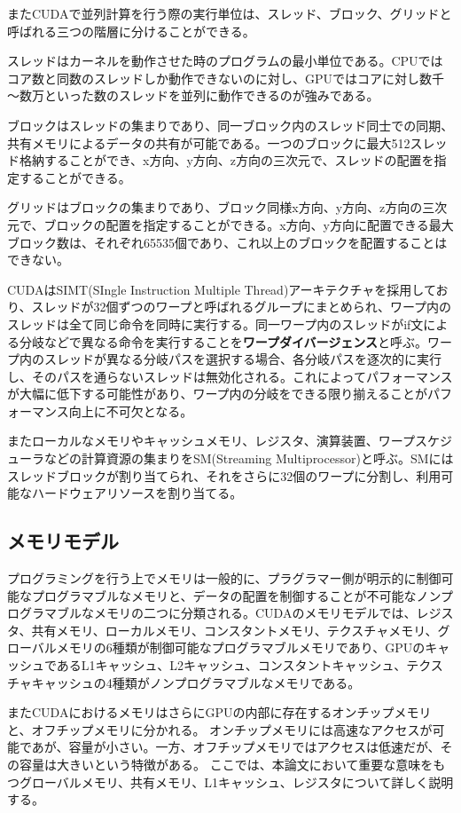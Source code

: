 \documentclass[a4paper,11pt,oneside,openany]{jsbook}
\begin{document}
またCUDAで並列計算を行う際の実行単位は、スレッド、ブロック、グリッドと呼ばれる三つの階層に分けることができる。

スレッドはカーネルを動作させた時のプログラムの最小単位である。CPUではコア数と同数のスレッドしか動作できないのに対し、GPUではコアに対し数千～数万といった数のスレッドを並列に動作できるのが強みである。

ブロックはスレッドの集まりであり、同一ブロック内のスレッド同士での同期、共有メモリによるデータの共有が可能である。一つのブロックに最大512スレッド格納することができ、x方向、y方向、z方向の三次元で、スレッドの配置を指定することができる。

グリッドはブロックの集まりであり、ブロック同様x方向、y方向、z方向の三次元で、ブロックの配置を指定することができる。x方向、y方向に配置できる最大ブロック数は、それぞれ65535個であり、これ以上のブロックを配置することはできない。

CUDAはSIMT(SIngle Instruction Multiple Thread)アーキテクチャを採用しており、スレッドが32個ずつのワープと呼ばれるグループにまとめられ、ワープ内のスレッドは全て同じ命令を同時に実行する。同一ワープ内のスレッドがif文による分岐などで異なる命令を実行することを{\bf ワープダイバージェンス}と呼ぶ。ワープ内のスレッドが異なる分岐パスを選択する場合、各分岐パスを逐次的に実行し、そのパスを通らないスレッドは無効化される。これによってパフォーマンスが大幅に低下する可能性があり、ワープ内の分岐をできる限り揃えることがパフォーマンス向上に不可欠となる。

またローカルなメモリやキャッシュメモリ、レジスタ、演算装置、ワープスケジューラなどの計算資源の集まりをSM(Streaming Multiprocessor)と呼ぶ。SMにはスレッドブロックが割り当てられ、それをさらに32個のワープに分割し、利用可能なハードウェアリソースを割り当てる。

\subsection{メモリモデル}
プログラミングを行う上でメモリは一般的に、プラグラマー側が明示的に制御可能なプログラマブルなメモリと、データの配置を制御することが不可能なノンプログラマブルなメモリの二つに分類される。CUDAのメモリモデルでは、レジスタ、共有メモリ、ローカルメモリ、コンスタントメモリ、テクスチャメモリ、グローバルメモリの6種類が制御可能なプログラマブルメモリであり、GPUのキャッシュであるL1キャッシュ、L2キャッシュ、コンスタントキャッシュ、テクスチャキャッシュの4種類がノンプログラマブルなメモリである。

またCUDAにおけるメモリはさらにGPUの内部に存在するオンチップメモリと、オフチップメモリに分かれる。
オンチップメモリには高速なアクセスが可能であが、容量が小さい。一方、オフチップメモリではアクセスは低速だが、その容量は大きいという特徴がある。
ここでは、本論文において重要な意味をもつグローバルメモリ、共有メモリ、L1キャッシュ、レジスタについて詳しく説明する。
\end{document}
